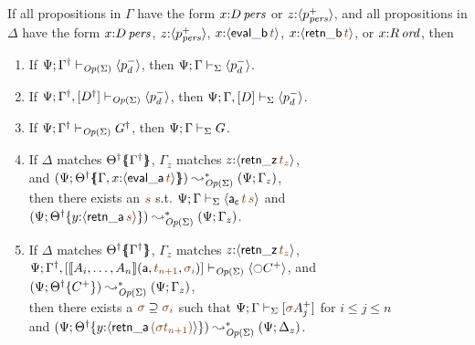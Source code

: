 \bigskip
\begin{theorem}\label{thm:opersound}
If all propositions in $\Gamma$ have the form 
$x{:}{D}\,{{\it pers}}$ or $z{:}\langle {p^+_{{\it pers}}} \rangle$, and all propositions in 
$\Delta$ have the form $x{:}{D}\,{{\it pers}}$, $z{:}\langle {p^+_{{\it pers}}} \rangle$,
$x{:}\susp{{\sf eval\_b}\,\lf{t}}$, $x{:}\susp{{\sf retn\_b}\,\lf{t}}$, or
$x{:}{R}\,{{\it ord}}$, then
\begin{enumerate}
\item If ${\Psi}; {{{\Gamma}^\dag}} \vdash_{{\it Op}({\Sigma})} {\langle {p^-_d} \rangle}$,
then ${\Psi}; {\Gamma} \vdash_{\Sigma} {\langle {p^-_d} \rangle}$.
\item If ${\Psi}; {{{\Gamma}^\dag}, [{{D}^\dag}]} \vdash_{{\it Op}({\Sigma})} {\langle {p^-_d} \rangle}$, then ${\Psi}; {\Gamma, [D]} \vdash_{\Sigma} {\langle {p^-_d} \rangle}$.
\item If ${\Psi}; {{{\Gamma}^\dag}} \vdash_{{\it Op}({\Sigma})} {{{G}^\dag}}$, then
 ${\Psi}; {\Gamma} \vdash_{\Sigma} {G}$.
\item If $\Delta$ matches ${{{\Theta}^\dag}}\mbox{$\{\hspace{-4pt}\{$}{{{\Gamma}^\dag}}\mbox{$\}\hspace{-4pt}\}$}$,
$\Gamma_z$ matches $z{:}\susp{{\sf retn\_z}\,\lf{t_z}}$, \\
and
$(\Psi; \frameoff{\opsubst{\Theta}}{\mkconj{\Gamma}{x{:}\susp{{\sf eval\_a}\,\lf{t}}}}) \leadsto^*_{\transop{\Sigma}} (\Psi; \Gamma_z)$, \\
then there exists an $\lf{s}$ s.t.
$\slss{\Sigma}{\Psi}{\Gamma}{\susp{{\sf a_c}\,\lf{t}\,\lf{s}}}$ and
$(\Psi; \tackon{\opsubst{\Theta}}{y{:}\susp{{\sf retn\_a}\,\lf{s}}}) 
   \leadsto^*_{\transop{\Sigma}}
 (\Psi; \Gamma_z)$.
\item If $\Delta$ matches ${{{\Theta}^\dag}}\mbox{$\{\hspace{-4pt}\{$}{{{\Gamma}^\dag}}\mbox{$\}\hspace{-4pt}\}$}$,
$\Gamma_z$ matches $z{:}\susp{{\sf retn\_z}\,\lf{t_z}}$, \\
$\slss{\transop{\Sigma}}{\Psi}{\opsubst{\Gamma}, [\opbasic{A_i,\ldots,A_n}{t_{n+1}}{\sigma_i}]}{\susp{{\ocircle}C^+}}{}$, and 
$(\Psi; {{{\Theta}^\dag}}\{{C^+}\})
         \leadsto^*_{{\it Op}({\Sigma})}
       (\Psi; \Gamma_z)$, \\
then there exists a $\lf{\sigma} \supseteq \lf{\sigma_i}$ such that 
$\slss{\Sigma}{\Psi}{\Gamma}{[\lf{\sigma}A^+_j]}$ for $i \leq j \leq n$\\
and 
$(\Psi; \tackon{\opsubst{\Theta}}{y{:}\susp{{\sf retn\_a}\,\lf{(\lf{\sigma t_{n+1}})}}})
  \leadsto^*_{\transop{\Sigma}}
 (\Psi; \Delta_z)$. 
\end{enumerate}
\end{theorem}


